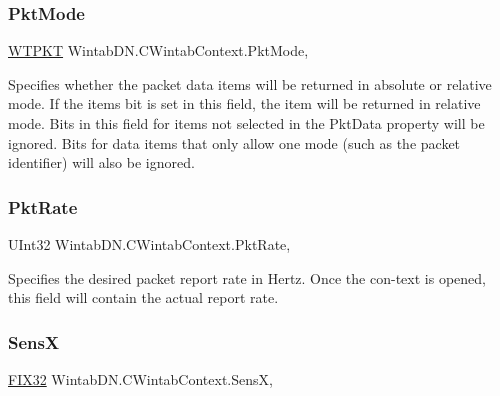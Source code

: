 \subsubsection{\texorpdfstring{Pkt\+Mode}{PktMode}}
{\footnotesize\ttfamily \mbox{\hyperlink{class_wintab_d_n_1_1_w_t_p_k_t}{W\+T\+P\+KT}} Wintab\+D\+N.\+C\+Wintab\+Context.\+Pkt\+Mode\hspace{0.3cm}{\ttfamily [get]}, {\ttfamily [set]}}



Specifies whether the packet data items will be returned in absolute or relative mode. If the item\textquotesingle{}s bit is set in this field, the item will be returned in relative mode. Bits in this field for items not selected in the Pkt\+Data property will be ignored. Bits for data items that only allow one mode (such as the packet identifier) will also be ignored. ~\newline


\mbox{\label{class_wintab_d_n_1_1_c_wintab_context_a20f3b1ba020637ac525e1a2f0a67011f}} 
\subsubsection{\texorpdfstring{Pkt\+Rate}{PktRate}}
{\footnotesize\ttfamily U\+Int32 Wintab\+D\+N.\+C\+Wintab\+Context.\+Pkt\+Rate\hspace{0.3cm}{\ttfamily [get]}, {\ttfamily [set]}}



Specifies the desired packet report rate in Hertz. Once the con-\/text is opened, this field will contain the actual report rate. 

\mbox{\label{class_wintab_d_n_1_1_c_wintab_context_ab5cff8c2a8dbecad852fb2fb7d4a31d4}} 
\subsubsection{\texorpdfstring{SensX}{SensX}}
{\footnotesize\ttfamily \mbox{\hyperlink{class_wintab_d_n_1_1_f_i_x32}{F\+I\+X32}} Wintab\+D\+N.\+C\+Wintab\+Context.\+SensX\hspace{0.3cm}{\ttfamily [get]}, {\ttfamily [set]}}



